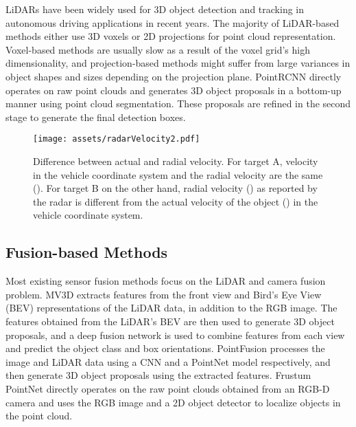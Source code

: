 \documentclass[10pt,twocolumn,letterpaper]{article}
\begin{document}
   LiDARs have been widely used for 3D object detection and tracking in autonomous
   driving applications in recent years. The majority of LiDAR-based methods either 
   use 3D voxels \cite{li3DFullyConvolutional2017,zhouVoxelNetEndtoEndLearning2017} 
   or 2D projections 
   \cite{liVehicleDetection3D2016, chenMultiView3DObject2017, yanSECONDSparselyEmbedded2018, yangPIXORRealtime3D2019} 
   for point cloud representation. Voxel-based methods are usually slow as a 
   result of the voxel grid's high dimensionality, and projection-based methods 
   might suffer from large variances in object shapes and sizes depending on the 
   projection plane. PointRCNN \cite{shiPointRCNN3DObject2019} directly 
   operates on raw point clouds and generates 3D object proposals in 
   a bottom-up manner using point cloud segmentation. These proposals are refined in 
   the second stage to generate the final detection boxes.
   
   \begin{figure}[t]
       \begin{center}
           \texttt{[image: assets/radarVelocity2.pdf]}
           \caption{Difference between actual and radial velocity. For target A, 
           velocity in the vehicle coordinate system and the radial velocity 
           are the same (). For target B on the other hand, radial velocity () 
           as reported by the radar is different from the actual velocity of the 
           object () in the vehicle coordinate system.}
           \label{fig:radarVel}
       \end{center}
   \end{figure}
   
   \subsection{Fusion-based Methods}
   Most existing sensor fusion methods focus on the LiDAR 
   and camera fusion problem. MV3D \cite{Chen_2017} extracts features from the
   front view and Bird's Eye View (BEV) representations of the LiDAR data, 
   in addition to the RGB image. The features obtained from the LiDAR's BEV are then used 
   to generate 3D object proposals, and a deep fusion network is used to combine 
   features from each view and predict the object class and box orientations.
   PointFusion \cite{xuPointFusionDeepSensor2018} processes the image and LiDAR 
   data using a CNN and a PointNet model respectively, and then generate 3D object 
   proposals using the extracted features. Frustum PointNet \cite{qiFrustumPointNets3D2018a}
   directly operates on the raw point clouds obtained from an RGB-D camera 
   and uses the RGB image and a 2D object detector to localize objects in the point cloud.
   
\end{document}
